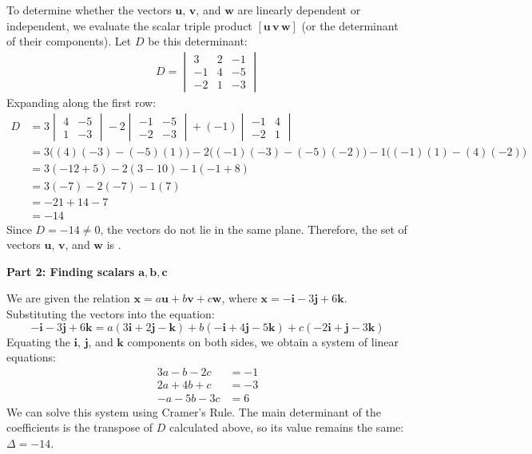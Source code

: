 \documentclass[12pt,a4paper]{article}
\begin{document}
\begin{enumerate}
\begin{tcolorbox}[enhanced,breakable,ansbox,colback=cD!4,colframe=cD,boxrule=0.8pt,arc=5pt,title={\textbf{Answer}},fonttitle=\bfseries\color{white},colbacktitle=cD]
To determine whether the vectors $\mathbf{u}$, $\mathbf{v}$, and $\mathbf{w}$ are linearly dependent or independent, we evaluate the scalar triple product $[\mathbf{u}\,\mathbf{v}\,\mathbf{w}]$ (or the determinant of their components). Let $D$ be this determinant:
\begin{align*}
    D = \begin{vmatrix}
        3 & 2 & -1 \\
        -1 & 4 & -5 \\
        -2 & 1 & -3
    \end{vmatrix}
\end{align*}
Expanding along the first row:
\begin{align*}
    D &= 3 \begin{vmatrix} 4 & -5 \\ 1 & -3 \end{vmatrix} - 2 \begin{vmatrix} -1 & -5 \\ -2 & -3 \end{vmatrix} + (-1) \begin{vmatrix} -1 & 4 \\ -2 & 1 \end{vmatrix} \\[1em]
    &= 3\big((4)(-3) - (-5)(1)\big) - 2\big((-1)(-3) - (-5)(-2)\big) - 1\big((-1)(1) - (4)(-2)\big) \\
    &= 3(-12 + 5) - 2(3 - 10) - 1(-1 + 8) \\
    &= 3(-7) - 2(-7) - 1(7) \\
    &= -21 + 14 - 7 \\
    &= -14
\end{align*}
Since $D = -14 \neq 0$, the vectors do not lie in the same plane. Therefore, the set of vectors $\mathbf{u}$, $\mathbf{v}$, and $\mathbf{w}$ is .

\vspace{1em}
\textbf{Part 2: Finding scalars } $\boldsymbol{a, b, c}$

We are given the relation $\mathbf{x} = a\mathbf{u} + b\mathbf{v} + c\mathbf{w}$, where $\mathbf{x} = -\mathbf{i} - 3\mathbf{j} + 6\mathbf{k}$. Substituting the vectors into the equation:
\[
    -\mathbf{i} - 3\mathbf{j} + 6\mathbf{k} = a(3\mathbf{i} + 2\mathbf{j} - \mathbf{k}) + b(-\mathbf{i} + 4\mathbf{j} - 5\mathbf{k}) + c(-2\mathbf{i} + \mathbf{j} - 3\mathbf{k})
\]
Equating the $\mathbf{i}$, $\mathbf{j}$, and $\mathbf{k}$ components on both sides, we obtain a system of linear equations:
\begin{align*}
    3a - b - 2c &= -1 \\
    2a + 4b + c &= -3 \\
    -a - 5b - 3c &= 6
\end{align*}
We can solve this system using Cramer's Rule. The main determinant of the coefficients is the transpose of $D$ calculated above, so its value remains the same: $\Delta = -14$. 


\end{tcolorbox}
\end{enumerate}
\end{document}
